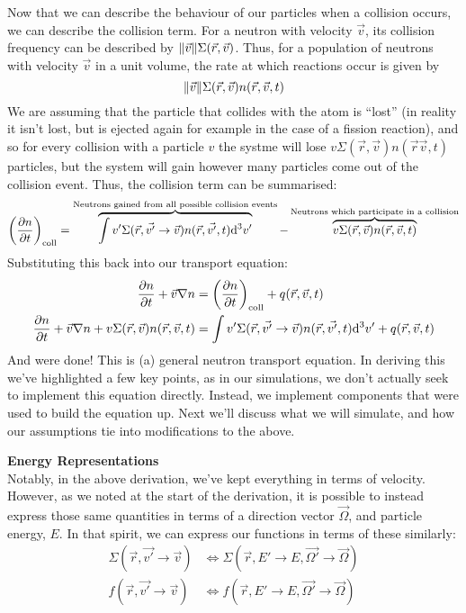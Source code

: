 \noindent 
Now that we can describe the behaviour of our particles when a collision occurs, we can describe the collision term. 
For a neutron with velocity $\vec{v}$, its collision frequency can be described by $\norm{\vec{v}} \Sigma(\vec{r}, \vec{v})$. Thus, for
a population of neutrons with velocity $\vec{v}$ in a unit volume, the rate at which reactions occur is given by 
$$\norm{\vec{v}} \Sigma(\vec{r}, \vec{v}) n(\vec{r}, \vec{v}, t)$$
We are assuming that the particle that collides with the atom is ``lost'' (in reality it isn't lost, but is ejected again 
for example in the case of a fission reaction), and so for every collision with a particle $v$ the systme will lose $v \Sigma(\vec{r}, \vec{v}) n(\vec{r} \vec{v}, t)$ 
particles, but the system will gain however many particles come out of the collision event. Thus, the collision term can be summarised:
\begin{equation*}
    \left ( \pdv{n}{t} \right )_{\text{coll}} = \overbrace{\int v' \Sigma(\vec{r}, \vec{v'} \to \vec{v}) n(\vec{r}, \vec{v'}, t) \dd^3 v'}^{\text{Neutrons gained from all possible collision events}} - \overbrace{v \Sigma(\vec{r}, \vec{v}) n(\vec{r}, \vec{v}, t)}^{\text{Neutrons which participate in a collision}} 
\end{equation*}
Substituting this back into our transport equation:
\begin{align*}
    \pdv{n}{t} + \vec{v} \nabla n &= \left ( \pdv{n}{t} \right )_\text{coll} + q(\vec{r}, \vec{v}, t) \\
    \pdv{n}{t} + \vec{v} \nabla n + v \Sigma(\vec{r}, \vec{v}) n(\vec{r}, \vec{v}, t) &= \int v' \Sigma(\vec{r}, \vec{v'} \to \vec{v}) n(\vec{r}, \vec{v'}, t) \dd^3 v' + q(\vec{r}, \vec{v}, t)
\end{align*}
And were done! This is (a) general neutron transport equation. In deriving this we've highlighted a few key points, as in our simulations, 
we don't actually seek to implement this equation directly. Instead, we implement components that were used to build the equation up. Next we'll discuss 
what we will simulate, and how our assumptions tie into modifications to the above.

\noindent \textbf{Energy Representations} \\
Notably, in the above derivation, we've kept everything in terms of velocity. However, as we noted at the start of the derivation, 
it is possible to instead express those same quantities in terms of a direction vector $\vec{\Omega}$, and particle energy, $E$.
In that spirit, we can express our functions in terms of these similarly:
\begin{align*}
    \Sigma(\vec{r}, \vec{v'} \to \vec{v}) &\iff \Sigma(\vec{r}, E' \to E, \vec{\Omega'} \to \vec{\Omega}) \\
    f(\vec{r}, \vec{v'} \to \vec{v}) &\iff f(\vec{r}, E' \to E, \vec{\Omega'} \to \vec{\Omega})
\end{align*}

